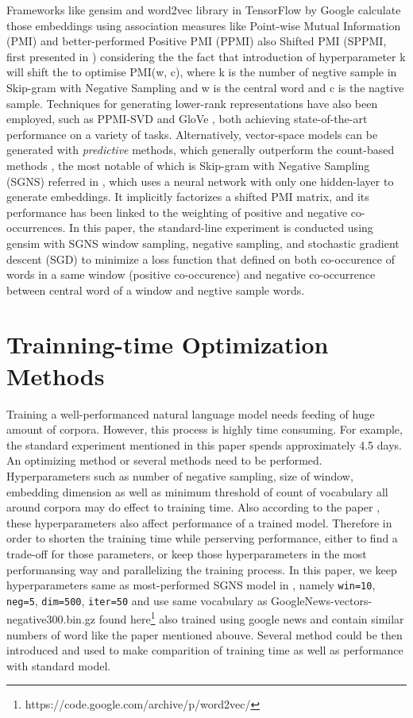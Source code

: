 \documentclass[11pt]{article}
\begin{document}
Frameworks like gensim and word2vec library in TensorFlow by Google calculate those embeddings using association measures like Point-wise Mutual Information (PMI)\cite{church1990word} and better-performed Positive PMI (PPMI)\cite{bullinaria2007extracting} also Shifted PMI (SPPMI, first presented in \cite{goldberg2014word2vec}) considering the the fact that introduction of hyperparameter k will shift the to optimise PMI(w, c), where k is the number of negtive sample in Skip-gram with Negative Sampling and w is the central word and c is the nagtive sample. Techniques for generating lower-rank representations have also been employed, such as PPMI-SVD  and GloVe , both achieving state-of-the-art performance on a variety of tasks. Alternatively, vector-space models can be generated with \emph{predictive} methods, which generally outperform the count-based methods , the most notable of which is Skip-gram with Negative Sampling (SGNS) referred in \cite{mikolov2013distributed}, which uses a neural network with only one hidden-layer to generate embeddings. It implicitly factorizes a shifted PMI matrix, and its performance has been linked to the weighting of positive and negative co-occurrences. In this paper, the standard-line experiment is conducted using gensim with SGNS window sampling, negative sampling, and stochastic gradient descent (SGD) to minimize a loss function that defined on both co-occurence of words in a same window (positive co-occurence) and negative co-occurrence between central word of a window and negtive sample words. 

\section{Trainning-time Optimization Methods}
Training a well-performanced natural language model needs feeding of huge amount of corpora. However, this process is highly time consuming. For example, the standard experiment mentioned in this paper spends approximately 4.5 days. An optimizing method or several methods need to be performed. Hyperparameters such as number of negative sampling, size of window, embedding dimension as well as minimum threshold of count of vocabulary all around corpora may do effect to training time. Also according to the paper \cite{levy2015improving}, these hyperparameters also affect performance of a trained model. Therefore in order to shorten the training time while perserving performance, either to find a trade-off for those parameters, or keep those hyperparameters in the most performansing way and parallelizing the training process. In this paper, we keep hyperparameters same as most-performed SGNS model in \cite{levy2015improving}, namely \verb|win=10|, \verb|neg=5|, \verb|dim=500|, \verb|iter=50| and use same vocabulary as GoogleNews-vectors-negative300.bin.gz found here\footnote{https://code.google.com/archive/p/word2vec/} also trained using google news and contain similar numbers of word like the paper mentioned abouve. Several method could be then introduced and used to make comparition of training time as well as performance with standard model.
\end{document}
